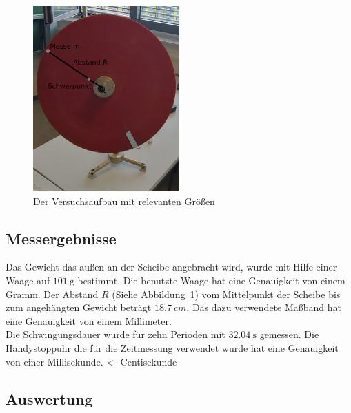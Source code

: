 \documentclass{article}
\begin{document}
	\begin{figure}[!ht]
		\centering
		\includegraphics[width=0.5\textwidth]{schwingung_aufbau.png}
		\caption{\label{fig:Schwingung_Aufbau}Der Versuchsaufbau mit relevanten Größen}
	\end{figure}

	\subsection{Messergebnisse}
	Das Gewicht das außen an der Scheibe angebracht wird, wurde mit Hilfe einer Waage auf \(\SI{101}{\gram}\) bestimmt.
	Die benutzte Waage hat eine Genauigkeit von einem Gramm.
	Der Abstand \(R\) (Siehe Abbildung~\ref{fig:Schwingung_Aufbau}) vom Mittelpunkt der Scheibe
	bis zum angehängten Gewicht beträgt \(\SI{18,7}{cm}\).
	Das dazu verwendete Maßband hat eine Genauigkeit von einem Millimeter. \\
	Die Schwingungsdauer wurde für zehn Perioden mit \(\SI{32,04}{\second}\) gemessen.
	Die Handystoppuhr die für die Zeitmessung verwendet wurde hat eine Genauigkeit von einer Millisekunde. <- Centisekunde

	\subsection{Auswertung}
\end{document}
